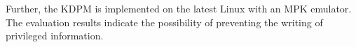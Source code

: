   Further, the KDPM is implemented on the latest Linux with an MPK emulator. 
  The evaluation results indicate the possibility of preventing the writing of
  privileged information. 
